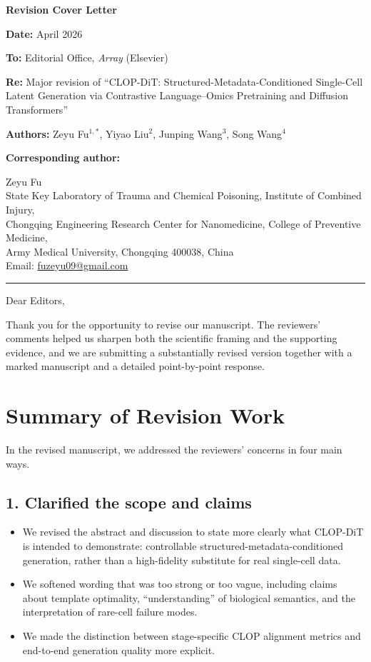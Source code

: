 \documentclass[11pt,letterpaper]{article}
\title{}
\author{}
\date{}
\begin{document}
\noindent
{\Large\bfseries Revision Cover Letter\par}
\vspace{0.8em}

\noindent\textbf{Date:} April 2026

\noindent\textbf{To:} Editorial Office, \emph{Array} (Elsevier)

\noindent\textbf{Re:} Major revision of ``CLOP-DiT: Structured-Metadata-Conditioned Single-Cell Latent
Generation via Contrastive Language--Omics Pretraining and Diffusion Transformers''

\noindent\textbf{Authors:} Zeyu Fu$^{1,*}$, Yiyao Liu$^{2}$, Junping Wang$^{3}$, Song Wang$^{4}$

\vspace{0.6em}
\noindent\textbf{Corresponding author:}

\noindent Zeyu Fu\\
State Key Laboratory of Trauma and Chemical Poisoning, Institute of Combined Injury,\\
Chongqing Engineering Research Center for Nanomedicine, College of Preventive Medicine,\\
Army Medical University, Chongqing 400038, China\\
Email: \href{mailto:fuzeyu09@gmail.com}{fuzeyu09@gmail.com}

\vspace{0.8em}
\hrule
\vspace{0.8em}

\noindent Dear Editors,

Thank you for the opportunity to revise our manuscript. The reviewers' comments helped us sharpen
both the scientific framing and the supporting evidence, and we are submitting a substantially
revised version together with a marked manuscript and a detailed point-by-point response.

\section*{Summary of Revision Work}

In the revised manuscript, we addressed the reviewers' concerns in four main ways.

\subsection*{1. Clarified the scope and claims}

\begin{itemize}
  \item We revised the abstract and discussion to state more clearly what CLOP-DiT is intended to
    demonstrate: controllable structured-metadata-conditioned generation, rather than a
    high-fidelity substitute for real single-cell data.
  \item We softened wording that was too strong or too vague, including claims about template
    optimality, ``understanding'' of biological semantics, and the interpretation of rare-cell
    failure modes.
  \item We made the distinction between stage-specific CLOP alignment metrics and end-to-end
    generation quality more explicit.
\end{itemize}
\end{document}
